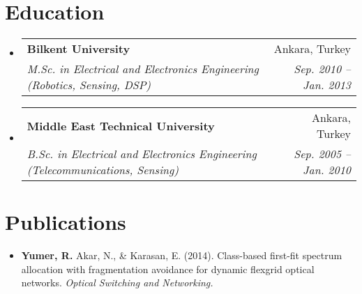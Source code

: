 \documentclass[letterpaper,11pt]{article}
\makeatletter
\newcommand{\resumeItem}[2]{
  \item\small{
    \textbf{#1}{: #2 \vspace{1pt}}
  }
}
\newcommand{\resumeSubheading}[4]{
  \vspace{-1pt}\item
    \begin{tabular*}{0.97\textwidth}{l@{\extracolsep{\fill}}r}
      \textbf{#1} & #2 \\
      \textit{\small#3} & \textit{\small #4} \\
    \end{tabular*}\vspace{-5pt}
}
\newcommand{\resumeSubHeadingListStart}{\begin{itemize}[leftmargin=*]}
\newcommand{\resumeSubHeadingListEnd}{\end{itemize}}
\newcommand{\resumeItemListStart}{\begin{itemize}}
\newcommand{\resumeItemListEnd}{\end{itemize}\vspace{-5pt}}
\makeatother
\begin{document}
\section{Education}
  \resumeSubHeadingListStart
    \resumeSubheading
      {Bilkent University}{Ankara, Turkey}
      {M.Sc. in Electrical and Electronics Engineering (Robotics, Sensing, DSP)}{Sep. 2010 -- Jan. 2013}
    \resumeSubheading
      {Middle East Technical University}{Ankara, Turkey}
      {B.Sc. in Electrical and Electronics Engineering (Telecommunications, Sensing)}{Sep. 2005 -- Jan. 2010}
  \resumeSubHeadingListEnd
  
\section{Publications}
  \resumeSubHeadingListStart
    \item{
    	\textbf{Yumer, R.}{ Akar, N., \& Karasan, E. (2014). Class-based first-fit spectrum allocation with fragmentation avoidance for dynamic flexgrid optical networks.}\textit{ Optical Switching and Networking.}
    }
  \resumeSubHeadingListEnd 

\end{document}
